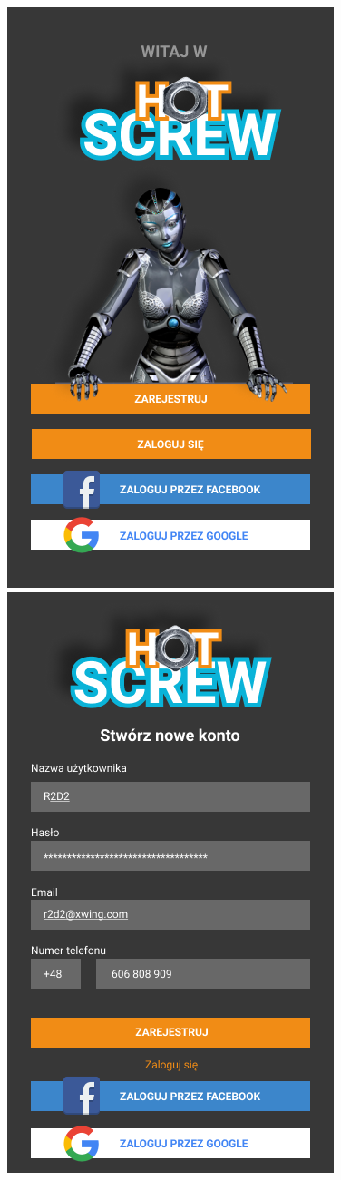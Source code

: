 \documentclass[12pt,a4paper]{article}
\begin{document}
	\begin{center}
		\includegraphics[width=0.6\linewidth]{img/Welcome.png}
		\includegraphics[width=0.6\linewidth]{img/Register.png}

\end{center}
\end{document}
